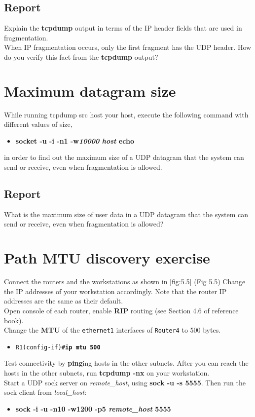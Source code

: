 \documentclass[10pt,a4paper]{article}
\numberwithin{equation}{section}
\numberwithin{figure}{section}
\numberwithin{table}{section}
\begin{document}
	\subsection*{Report}
	Explain the \textbf{tcpdump} output in terms of the IP header fields that are used in fragmentation. \\
	When IP fragmentation occurs, only the first fragment has the UDP header.
	How do you verify this fact from the \textbf{tcpdump} output?


\section{Maximum datagram size}
\label{sec:MaxDatagramSize}
	While running tcpdump src host your host, execute the following command with different values of size,
	\begin{itemize}
		\item \textbf{socket -u -i -n1 -w\textit{10000} \textit{host} echo}
	\end{itemize}
	in order to find out the maximum size of a UDP datagram that the system can send or receive, even when fragmentation is allowed.

\subsection*{Report}
	What is the maximum size of user data in a UDP datagram that the system can send or receive, even when fragmentation is allowed?


\section*{Path MTU discovery exercise}
	Connect the routers and the workstations as shown in \autoref{fig:5.5} (Fig 5.5) Change the IP
	addresses of your workstation accordingly. Note that the router IP addresses are
	the same as their default.\\
	Open console of  each router, enable \textbf{RIP} routing (see Section 4.6 of reference book).\\
	Change the \textbf{MTU} of the \texttt{ethernet1} interfaces of \texttt{Router4} to 500
	bytes.
	\begin{itemize}
		\item \texttt{R1(config-if)\#\textbf{ip mtu 500}}
	\end{itemize}
	Test connectivity by \textbf{ping}ing hosts in the other subnets. After you can reach the
	hosts in the other subnets, run \textbf{tcpdump -nx} on your workstation.\\
	Start a UDP sock server on \textit{remote\_host}, using \textbf{sock -u -s 5555}.
	Then run the sock client from \textit{local\_host}:
	\begin{itemize}
		\item \textbf{sock -i -u -n10 -w1200 -p5 \textit{remote\_host} 5555}
	\end{itemize}
\end{document}
